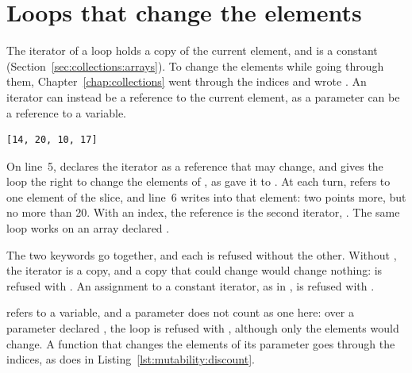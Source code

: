 \vfill\pagebreak
\section{Loops that change the elements}
\label{sec:mutability:loops}

The iterator of a  loop holds a copy of the current element, and is a
constant (Section~\ref{sec:collections:arrays}). To change the elements while
going through them, Chapter~\ref{chap:collections} went through the indices and
wrote . An iterator can instead be a reference to the current
element, as a parameter can be a reference to a variable.


\vspace{-10pt}%
\begin{lstlisting}[style=bashVerb]
[14, 20, 10, 17]
\end{lstlisting}

On line~5,  declares the iterator as a reference that may
change, and  gives the loop the right to change the elements
of , as  gave it to . At each turn,
 refers to one element of the slice, and line~6 writes into that
element: two points more, but no more than 20. With an index, the reference is
the second iterator, . The same loop works
on an array declared .

The two keywords go together, and each is refused without the other. Without
, the iterator is a copy, and a copy that could change would change
nothing:  is refused with
. An assignment to a constant iterator, as in
, is refused with
.

 refers to a variable, and a parameter does not count as one
here: over a parameter declared , the loop
 is refused with , although only the elements
would change. A function that changes the elements of its parameter goes
through the indices, as  does in
Listing~\ref{lst:mutability:discount}.

